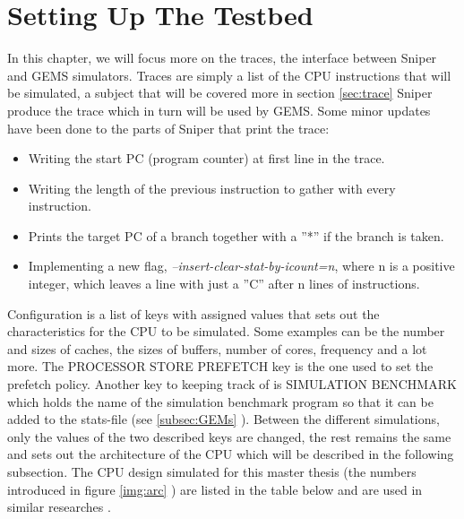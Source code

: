 \chapter{Setting Up The Testbed}
\label{chap:SettingUpTheTestbed} 
In this chapter, we will focus more on the traces, the interface between Sniper and GEMS simulators.
Traces are simply a list of the CPU instructions that will be simulated, a subject that will be covered more in section \ref{sec:trace} Sniper produce the trace which in turn will be used by GEMS. Some minor updates have been done to the parts of Sniper that print the trace:
\begin{itemize}
\item Writing the start PC (program counter) at first line in the trace.
\item Writing the length of the previous instruction to gather with every instruction.
\item Prints the target PC of a branch together with a ”*” if the branch is taken.
\item Implementing a new flag,\emph{ –insert-clear-stat-by-icount=n}, where n is a positive
integer, which leaves a line with just a ”C” after n lines of instructions.    
\end{itemize}

Configuration is a list of keys with assigned values that sets out the characteristics
for the CPU to be simulated. Some examples can be the number and sizes of
caches, the sizes of buffers, number of cores, frequency and a lot more. The PROCESSOR
STORE PREFETCH key is the one used to set the prefetch policy. Another
key to keeping track of is SIMULATION BENCHMARK which holds the name of the
simulation benchmark program so that it can be added to the stats-file (see \ref{subsec:GEMs} ). Between
the different simulations, only the values of the two described keys are changed,
the rest remains the same and sets out the architecture of the CPU which will be described in
the following subsection.
\newpage
{}
The CPU design simulated for this master thesis (the numbers introduced in figure
\ref{img:arc} ) are listed in the table below and are used in similar researches \cite{thePaper}. 


